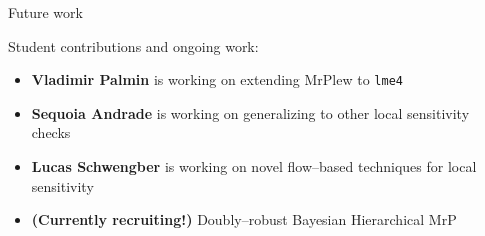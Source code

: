 \begin{frame}{Future work}

Student contributions and ongoing work:

\begin{itemize}
\item \textbf{Vladimir Palmin} is working on extending MrPlew to \texttt{lme4}
\item \textbf{Sequoia Andrade} is working on generalizing to other local sensitivity checks
\item \textbf{Lucas Schwengber} is working on novel flow--based techniques for local sensitivity
\item \textbf{(Currently recruiting!)} Doubly--robust Bayesian Hierarchical MrP
\end{itemize}



\end{frame}

